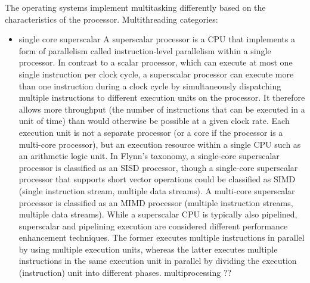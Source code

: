 The operating systems implement multitasking differently based on the characteristics of the processor.
Multithreading categories:
\begin{itemize}
    \item single core
        \subitem superscalar
    A superscalar processor is a CPU that implements a form of parallelism called instruction-level parallelism within a
    single processor.
    In contrast to a scalar processor, which can execute at most one single instruction per clock
    cycle, a superscalar processor can execute more than one instruction during a clock cycle by simultaneously
    dispatching multiple instructions to different execution units on the processor.
    It therefore allows more throughput (the number of instructions that can be executed in a unit of time) than would
    otherwise be possible at a given clock rate.
    Each execution unit is not a separate processor (or a core if the processor is a multi-core processor), but an
    execution resource within a single CPU such as an arithmetic logic unit.
    In Flynn's taxonomy, a single-core superscalar processor is classified as an SISD processor, though a single-core
    superscalar processor that supports short vector operations could be classified as SIMD (single instruction stream,
    multiple data streams).
    A multi-core superscalar processor is classified as an MIMD processor (multiple instruction streams, multiple data streams).
    While a superscalar CPU is typically also pipelined, superscalar and pipelining execution are considered different performance
    enhancement techniques.
    The former executes multiple instructions in parallel by using multiple execution units, whereas the latter executes
    multiple instructions in the same execution unit in parallel by dividing the execution (instruction) unit into
    different phases.
        \subitem multiprocessing
    ??


\end{itemize}
